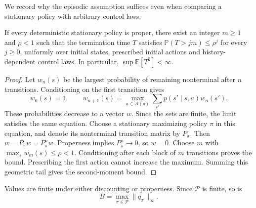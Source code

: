 We record why the episodic assumption suffices even when comparing a stationary policy with arbitrary control laws.
\begin{lemma}\label{lem: uniform termination}
If every deterministic stationary policy is proper, there exist an integer $m\ge1$ and $\rho<1$ such that the termination time $T$ satisfies $\mathbb P(T>jm)\le\rho^j$ for every $j\ge0$, uniformly over initial states, prescribed initial actions and history-dependent control laws. In particular, $\sup\mathbb E[T^2]<\infty$.
\end{lemma}
\begin{proof}
Let $w_n(s)$ be the largest probability of remaining nonterminal after $n$ transitions. Conditioning on the first transition gives
\[
w_0(s)=1,\qquad w_{n+1}(s)=\max_{a\in\mathcal A(s)}\sum_{s'}p(s'\mid s,a)w_n(s').
\]
These probabilities decrease to a vector $w$. Since the sets are finite, the limit satisfies the same equation. Choose a stationary maximizing policy $\pi$ in this equation, and denote its nonterminal transition matrix by $P_\pi$. Then $w=P_\pi w=P_\pi^n w$. Properness implies $P_\pi^n\to0$, so $w=0$. Choose $m$ with $\max_s w_m(s)\le\rho<1$. Conditioning after each block of $m$ transitions proves the bound. Prescribing the first action cannot increase the maximum. Summing this geometric tail gives the second-moment bound.
\end{proof}

Values are finite under either discounting or properness. Since $\mathcal P$ is finite, so is
\begin{equation}\label{eq: target bound}
B=\max_{\pi\in\mathcal P}\|q_\pi\|_\infty.
\end{equation}

